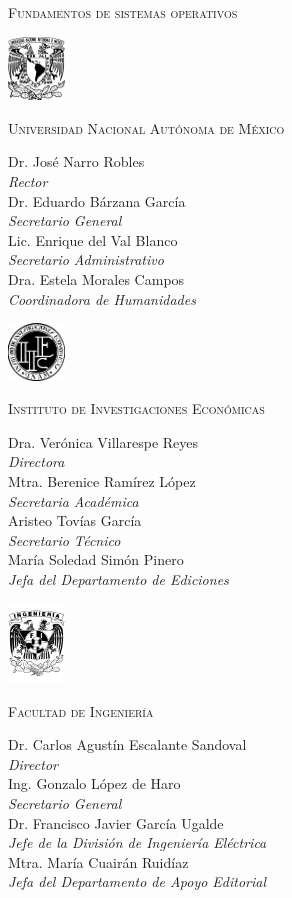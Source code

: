 \pagestyle{empty}
\renewcommand{\thepage}{\arabic{page}}

\textsc{Fundamentos de sistemas operativos}

\eject

\begin{center}
  \includegraphics[width=1.5cm]{unam/logo_unam}

  \textsc{Universidad Nacional Autónoma de México}

  Dr. José Narro Robles\\\textit{Rector}\\
  Dr. Eduardo Bárzana García\\\textit{Secretario General}\\
  Lic. Enrique del Val Blanco\\\textit{Secretario Administrativo}\\
  Dra. Estela Morales Campos\\\textit{Coordinadora de Humanidades}

  \vfill
  \includegraphics[width=1.5cm]{unam/logo_iiec}

  \textsc{Instituto de Investigaciones Económicas}

  Dra. Verónica Villarespe Reyes\\\textit{Directora}\\
  Mtra. Berenice Ramírez López\\\textit{Secretaria Académica}\\
  Aristeo Tovías García\\\textit{Secretario Técnico}\\
  María Soledad Simón Pinero\\\textit{Jefa del Departamento de Ediciones}

  \vfill
  \includegraphics[width=1.5cm]{unam/logo_fi}

  \textsc{Facultad de Ingeniería}

  Dr. Carlos Agustín Escalante Sandoval\\\textit{Director}\\
  Ing. Gonzalo López de Haro\\\textit{Secretario General}\\
  Dr. Francisco Javier García Ugalde\\\textit{Jefe de la División de
    Ingeniería Eléctrica}\\
  Mtra. María Cuairán Ruidíaz\\\textit{Jefa del Departamento de Apoyo Editorial}

\end{center}



